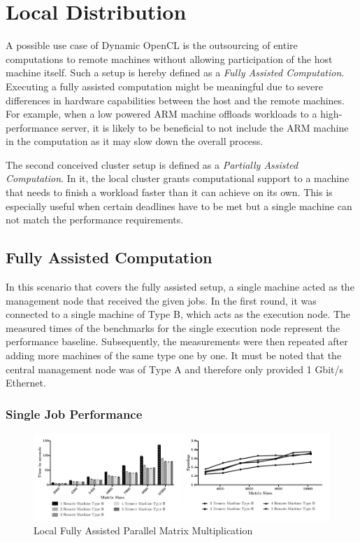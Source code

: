 \section{Local Distribution}
\label{local_distribution}
A possible use case of Dynamic OpenCL is the outsourcing of entire computations to remote machines without allowing participation of the host machine itself. Such a setup is hereby defined as a \textit{Fully Assisted Computation}. Executing a fully assisted computation might be meaningful due to severe differences in hardware capabilities between the host and the remote machines. For example, when a low powered ARM machine offloads workloads to a high-performance server, it is likely to be beneficial to not include the ARM machine in the computation as it may slow down the overall process.

The second conceived cluster setup is defined as a \textit{Partially Assisted Computation}. In it, the local cluster grants computational support to a machine that needs to finish a workload faster than it can achieve on its own. This is especially useful when certain deadlines have to be met but a single machine can not match the performance requirements.

\subsection{Fully Assisted Computation}
In this scenario that covers the fully assisted setup, a single machine acted as the management node that received the given jobs. In the first round, it was connected to a single machine of Type B, which acts as the execution node. The measured times of the benchmarks for the single execution node represent the performance baseline. Subsequently, the measurements were then repeated after adding more machines of the same type one by one. It must be noted that the central management node was of Type A and therefore only provided 1 Gbit/s Ethernet.

\subsubsection*{Single Job Performance}

\begin{figure}[!htb]

	\includegraphics[width=1.0\textwidth]{images/local_fully_assisted_matrix.pdf}
	\centering
	\caption{Local Fully Assisted Parallel Matrix Multiplication}
	\label{img:fully_assisted_parallel_matrix}
\end{figure}

